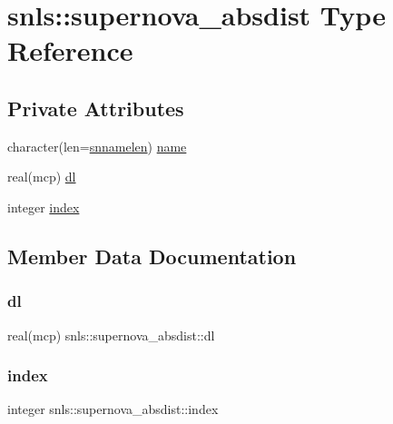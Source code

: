 \hypertarget{structsnls_1_1supernova__absdist}{}\section{snls\+:\+:supernova\+\_\+absdist Type Reference}
\label{structsnls_1_1supernova__absdist}
\subsection*{Private Attributes}
\begin{DoxyCompactItemize}
\item 
character(len=\mbox{\hyperlink{namespacesnls_a0985d8ccb89aafea09ab6de4c78c5600}{snnamelen}}) \mbox{\hyperlink{structsnls_1_1supernova__absdist_af3c1b84b2590c58f4888bc142ca12c62}{name}}
\item 
real(mcp) \mbox{\hyperlink{structsnls_1_1supernova__absdist_a556b05808d82460bf479c6918864b521}{dl}}
\item 
integer \mbox{\hyperlink{structsnls_1_1supernova__absdist_ab4ac10b84bab25104da15511720ebee8}{index}}
\end{DoxyCompactItemize}


\subsection{Member Data Documentation}
\mbox{\label{structsnls_1_1supernova__absdist_a556b05808d82460bf479c6918864b521}} 
\subsubsection{\texorpdfstring{dl}{dl}}
{\footnotesize\ttfamily real(mcp) snls\+::supernova\+\_\+absdist\+::dl\hspace{0.3cm}{\ttfamily [private]}}

\mbox{\label{structsnls_1_1supernova__absdist_ab4ac10b84bab25104da15511720ebee8}} 
\subsubsection{\texorpdfstring{index}{index}}
{\footnotesize\ttfamily integer snls\+::supernova\+\_\+absdist\+::index\hspace{0.3cm}{\ttfamily [private]}}

